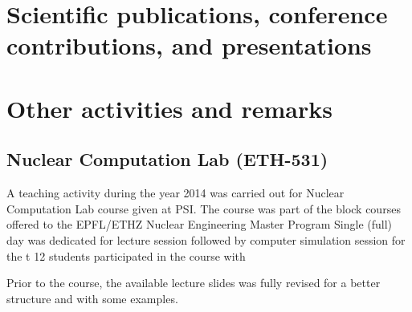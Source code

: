 \documentclass[11pt,titlepage]{article}
\begin{document}
\pagebreak

\section{Scientific publications, conference contributions, and presentations}

\nocite{Wicaksono2014a}
\nocite{Wicaksono2014b}
\nocite{Wicaksono2014c}
\nocite{Wicaksono2014d}
\nocite{Wicaksono2014e}
\printbibliography[heading=none]

\section{Other activities and remarks}

\subsection{Nuclear Computation Lab (ETH-531)}

A teaching activity during the year 2014 was carried out for Nuclear Computation Lab 
course given at PSI.
The course was part of the block courses offered to the EPFL/ETHZ Nuclear 
Engineering Master Program
Single (full) day was dedicated for lecture session followed by computer 
simulation session for the t
12 students participated in the course with 

Prior to the course, the available lecture slides was fully revised for a better structure and with some examples.
 
\end{document}

